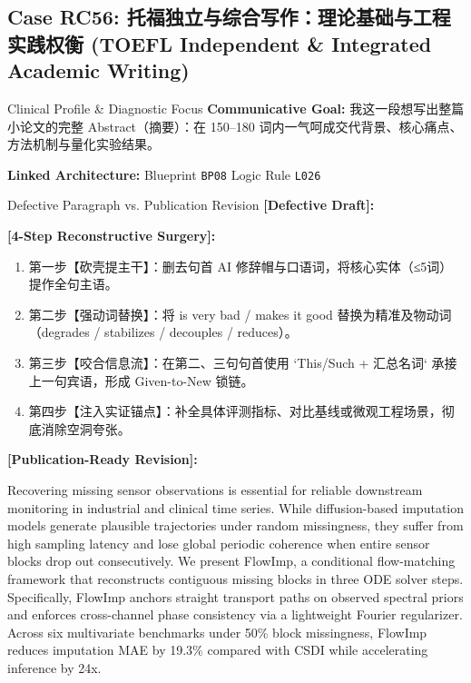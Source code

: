 \subsection{Case RC56: 托福独立与综合写作：理论基础与工程实践权衡 (TOEFL Independent \& Integrated Academic Writing)}\label{case:RC56}
\begin{ConceptBox}{Clinical Profile \& Diagnostic Focus}
\textbf{Communicative Goal:} 我这一段想写出整篇小论文的完整 Abstract（摘要）：在 150--180 词内一气呵成交代背景、核心痛点、方法机制与量化实验结果。\par
\textbf{Linked Architecture:} Blueprint \texttt{BP08} \enspace\textbar\enspace Logic Rule \texttt{L026}
\end{ConceptBox}
\begin{ExampleBox}{Defective Paragraph vs. Publication Revision}
\textbf{\color{TargetHighlight}[Defective Draft]:}\par
{}\par\vspace{6pt}
\textbf{\color{AcadForest}[4-Step Reconstructive Surgery]:}
\begin{enumerate}[label=\textbf{\color{AcadNavy}Step \arabic*:}, leftmargin=2em]
  \item 第一步【砍壳提主干】：删去句首 AI 修辞帽与口语词，将核心实体（≤5词）提作全句主语。
  \item 第二步【强动词替换】：将 is very bad / makes it good 替换为精准及物动词（degrades / stabilizes / decouples / reduces）。
  \item 第三步【咬合信息流】：在第二、三句句首使用 `This/Such + 汇总名词` 承接上一句宾语，形成 Given-to-New 锁链。
  \item 第四步【注入实证锚点】：补全具体评测指标、对比基线或微观工程场景，彻底消除空洞夸张。
\end{enumerate}\vspace{4pt}
\textbf{\color{AcadNavy}[Publication-Ready Revision]:}\par
Recovering missing sensor observations is essential for reliable downstream monitoring in industrial and clinical time series. While diffusion-based imputation models generate plausible trajectories under random missingness, they suffer from high sampling latency and lose global periodic coherence when entire sensor blocks drop out consecutively. We present FlowImp, a conditional flow-matching framework that reconstructs contiguous missing blocks in three ODE solver steps. Specifically, FlowImp anchors straight transport paths on observed spectral priors and enforces cross-channel phase consistency via a lightweight Fourier regularizer. Across six multivariate benchmarks under 50\% block missingness, FlowImp reduces imputation MAE by 19.3\% compared with CSDI while accelerating inference by 24x.
\end{ExampleBox}

